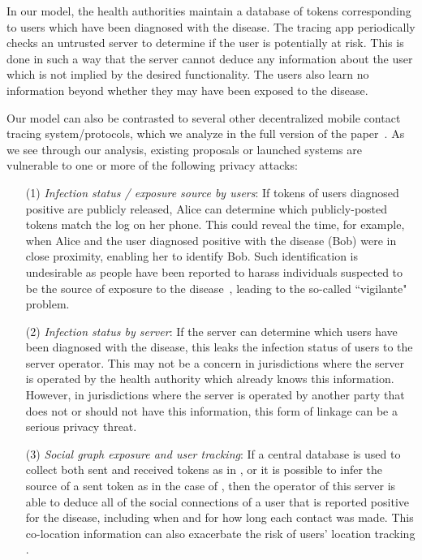 \documentclass[11pt]{article} %
\begin{document}
In our model, the health authorities maintain a database of tokens corresponding to users which have been diagnosed with the disease. The tracing app periodically checks an untrusted server to determine if the user is potentially at risk. This is done in such a way that the server cannot deduce any information about the user which is not implied by the desired functionality. The users also learn no information beyond whether they may have been exposed to the disease.

Our model can also be contrasted to several other decentralized mobile contact tracing system/protocols, which we analyze in the full version of the paper~\cite{epione}. As we see through our analysis, existing proposals or launched systems are vulnerable to one or more of the following privacy attacks:

\begin{itemize}%
	\item[(1)] {\em Infection status / exposure source by users}: If tokens of users diagnosed positive are publicly released, Alice can determine which publicly-posted tokens match the log on her phone. This could reveal the time, for example, when Alice and the user diagnosed positive with the disease (Bob) were in close proximity, enabling her to identify Bob. Such identification is undesirable as people have been reported to harass individuals suspected to be the source of exposure to the disease~\cite{korea-harassment}, leading to the so-called ``vigilante" problem.
	
	\item[(2)] {\em Infection status by server}: If the server can determine which users have been diagnosed with the disease, this leaks the infection status of users to the server operator. This may not be a concern in jurisdictions where the server is operated by the health authority which already knows this information. However, in jurisdictions where the server is operated by another party that does not or should not have this information, this form of linkage can be a serious privacy threat.
	
	\item[(3)] {\em Social graph exposure and user tracking}: If a central database is used to collect both sent and received tokens as in \cite{Covid-watch}, or it is possible to infer the source of a sent token as in the case of \cite{TraceTogether}, then the operator of this server is able to deduce all of the social connections of a user that is reported positive for the disease, including when and for how long each contact was made. This co-location information can also exacerbate the risk of users' location tracking \cite{olteanu2016quantifying, shokri2011quantifying}.
	

\end{itemize}
\end{document}
